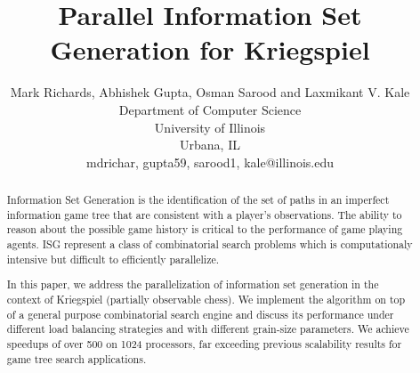 \documentclass[times, 10pt,twocolumn]{article}
\begin{document}
\title{Parallel Information Set Generation for Kriegspiel 
       }

\author{Mark Richards, Abhishek Gupta, Osman Sarood and Laxmikant V. Kale\\
Department of Computer Science\\ 
University of Illinois\\ 
Urbana, IL\\ {mdrichar, gupta59, sarood1, kale}@illinois.edu\\
}

\maketitle
\thispagestyle{empty}



\begin{abstract}
Information Set Generation is the identification of the set of paths in an imperfect information game tree that are
consistent with a player's observations.  The ability to reason about the possible game history is critical to the
performance of game playing agents.  ISG represent a class of combinatorial search problems which is computationaly intensive but difficult to efficiently parallelize.

In this paper, we address the parallelization of information set generation in the context
of Kriegspiel (partially observable chess).  We implement the algorithm on top of a general purpose combinatorial search
engine and discuss its performance under different load balancing strategies and with different grain-size parameters.
We achieve speedups of over 500 on 1024 processors, far exceeding previous scalability results for game tree search applications.
\end{abstract}
\end{document}
